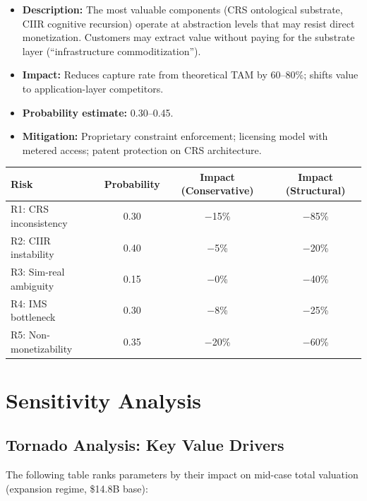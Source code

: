 \documentclass[11pt,a4paper]{article}
\theoremstyle{remark}
\begin{document}
\begin{itemize}[nosep]
  \item \textbf{Description:} The most valuable components (CRS
        ontological substrate, CIIR cognitive recursion) operate at
        abstraction levels that may resist direct monetization.
        Customers may extract value without paying for the substrate
        layer (``infrastructure commoditization'').
  \item \textbf{Impact:} Reduces capture rate from theoretical TAM
        by 60--80\%; shifts value to application-layer competitors.
  \item \textbf{Probability estimate:} 0.30--0.45.
  \item \textbf{Mitigation:} Proprietary constraint enforcement;
        licensing model with metered access; patent protection on
        CRS architecture.
\end{itemize}

\begin{center}
\renewcommand{\arraystretch}{1.3}
\begin{tabular}{lccc}
\toprule
\textbf{Risk} & \textbf{Probability} & \textbf{Impact (Conservative)} & \textbf{Impact (Structural)} \\
\midrule
R1: CRS inconsistency  & 0.30 & $-$15\% & $-$85\% \\
R2: CIIR instability    & 0.40 & $-$5\%  & $-$20\% \\
R3: Sim-real ambiguity  & 0.15 & $-$0\%  & $-$40\% \\
R4: IMS bottleneck      & 0.30 & $-$8\%  & $-$25\% \\
R5: Non-monetizability  & 0.35 & $-$20\% & $-$60\% \\
\bottomrule
\end{tabular}
\end{center}


\section{Sensitivity Analysis}
\label{sec:sensitivity}

\subsection{Tornado Analysis: Key Value Drivers}

The following table ranks parameters by their impact on mid-case
total valuation (expansion regime, \$14.8B base):
\end{document}
